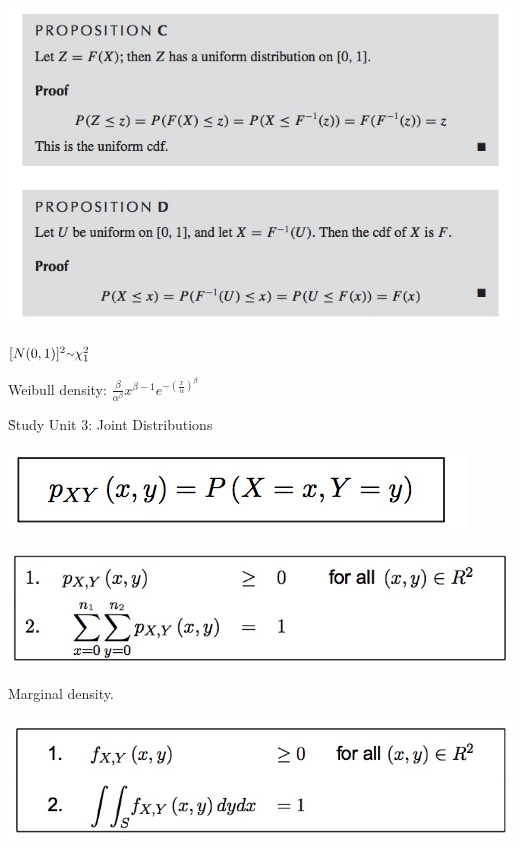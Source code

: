 \documentclass{examnotes}
\begin{document}
{\includegraphics[scale=0.6]{./img/2fun2.jpg}

$[N(0,1)]^2\mytilde \chi^2_1$

Weibull density: $\displaystyle\frac{\beta}{\alpha^\beta}x^{\beta-1}e^{-\left(\displaystyle\frac{x}{\alpha}\right)^\beta}$

\h{Study Unit 3: Joint Distributions}


\includegraphics[scale=0.4]{./img/3jd1.jpg}

\includegraphics[scale=0.4]{./img/3jd2.jpg}


Marginal density.

\includegraphics[scale=0.4]{./img/3con1.jpg}                                         

}
\end{document}
